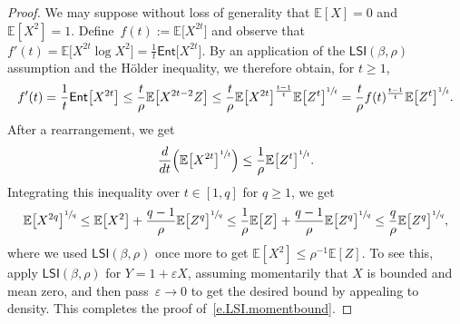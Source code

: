 \documentclass[11pt]{article} %
\numberwithin{equation}{section}
\theoremstyle{definition}
\let\originalleft\left
\let\originalright\right
\renewcommand{\left}{\mathopen{}\mathclose\bgroup\originalleft}
\renewcommand{\right}{\aftergroup\egroup\originalright}
\newcommand{\eps}{\varepsilon}
\newcommand{\ep}{\eps}
\newcommand{\E}{\mathbb{E}}
\newcommand{\Ent}{\mathsf{Ent}}
\newcommand{\LSI}{\mathsf{LSI}}
\begin{document}
\begin{proof}
We may suppose without loss of generality that $\E[X]=0$ and $\E[X^2] = 1$. 
Define~$f(t):= \E \big[X^{2t} \big]$ and observe that $f'(t) =  \E \big[ X^{2t} \log X^2\big] = 
\frac1t \Ent\big[ X^{2t} \big]$. 
By an application of the $\LSI(\beta,\rho)$ assumption and the H\"older inequality, we therefore obtain, for $t \geq 1$, 
\begin{equation}
\label{e.getmomentsLSI}
f'(t)=\frac1t \Ent\big[ X^{2t} \big]
\leq
\frac{t}\rho \E\big[ X^{2t-2} Z \big]
\leq 
\frac{t}\rho \E \big[ X^{2t} \big]^{\frac{t-1}{t}} \E \big[ Z^t \big]^{\sfrac1t} = \frac{t}\rho f(t)^{\frac{t-1}{t}} \E \big[ Z^t \big]^{\sfrac1t}.
\end{equation}
After a rearrangement, we get 
\begin{equation*}
\frac{d}{dt} \left( \E \big[X^{2t} \big]^{\sfrac1t} \right) \leq \frac1\rho\E \big[ Z^t \big]^{\sfrac1t}.
\end{equation*}
Integrating this inequality over $t\in [1,q]$ for $q \geq 1$, we get
\begin{equation*}
\E \big[ X^{2q} \big]^{\sfrac1q} 
\leq 
\E \big[ X^{2} \big] 
+ 
\frac{q-1}{\rho} \E \big[ Z^{q} \big]^{\sfrac1q}
\leq 
\frac1\rho\E \big[ Z \big]
+
\frac{q-1}{\rho} \E \big[ Z^{q} \big]^{\sfrac1q}
\leq 
\frac{q}{\rho} \E \big[ Z^{q} \big]^{\sfrac1q},
\end{equation*}
where we used $\LSI(\beta,\rho)$ once more to get $\E[X^2]\leq \rho^{-1}\E[Z]$. To see this, apply $\LSI(\beta,\rho)$ for $Y=1 + \ep X$, assuming momentarily that $X$ is bounded and mean zero, and then pass~$\ep \to 0$ to get the desired bound by appealing to density. This completes the proof of~\eqref{e.LSI.momentbound}. 

\smallskip


\end{proof}
\end{document}
